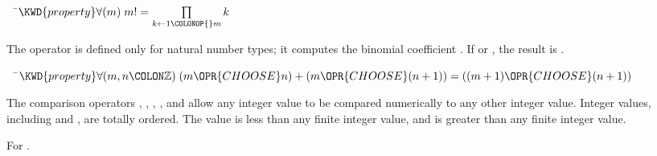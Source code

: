 \begin{Fortress}
{\tt~~}\pushtabs\=\+\(  \KWD{property} \forall (m)\; m! = \prod\limits_{k\leftarrow{}1\COLONOP{}m} k\)\-\\\poptabs
\end{Fortress}



The  operator is defined only for natural number types;
it computes the binomial coefficient .
If  or , the result is .

\begin{Fortress}
{\tt~~}\pushtabs\=\+\(  \KWD{property} \forall (m,n\COLON \mathbb{Z})\; (m \OPR{CHOOSE} n) + (m \OPR{CHOOSE} (n+1)) = ((m+1) \OPR{CHOOSE} (n+1))\)\-\\\poptabs
\end{Fortress}





The comparison operators \EXP{<}, \EXP{\leq}, \EXP{=}, \EXP{\geq}, and \EXP{>}
allow any integer value to be compared numerically to any other integer value.
Integer values, including \EXP{+\infty} and \EXP{-\infty}, are totally ordered.
The value \EXP{-\infty} is less than any finite integer value,
and \EXP{+\infty} is greater than any finite integer value.

For \EXP{\neq} .




